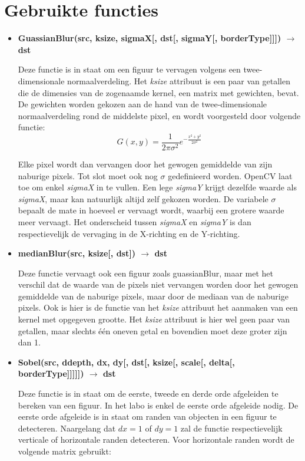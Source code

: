 \documentclass{article}
\begin{document}
	\section{Gebruikte functies}
	\begin{itemize}
		 \item \textbf{GuassianBlur(src, ksize, sigmaX[, dst[, sigmaY[, borderType]]]) $\rightarrow$ dst}
		 
		 Deze functie is in staat om een figuur te vervagen volgens een twee-dimensionale normaalverdeling. Het \textit{ksize} attribuut is een paar van getallen die de dimensies van de zogenaamde kernel, een matrix met gewichten, bevat. De gewichten worden gekozen aan de hand van de twee-dimensionale normaalverdeling rond de middelste pixel, en wordt voorgesteld door volgende functie:
		 $$G(x, y) = \frac{1}{2\pi\sigma^2}e^{-\frac{x^2 + y^2}{2\sigma^2}}$$
		 
		 Elke pixel wordt dan vervangen door het gewogen gemiddelde van zijn naburige pixels. Tot slot moet ook nog $\sigma$ gedefinieerd worden. OpenCV laat toe om enkel \textit{sigmaX} in te vullen. Een lege \textit{sigmaY} krijgt dezelfde waarde als \textit{sigmaX}, maar kan natuurlijk altijd zelf gekozen worden. De variabele $\sigma$ bepaalt de mate in hoeveel er vervaagt wordt, waarbij een grotere waarde meer vervaagt. Het onderscheid tussen \textit{sigmaX} en \textit{sigmaY} is dan respectievelijk de vervaging in de X-richting en de Y-richting.
		
		 \item \textbf{medianBlur(src, ksize[, dst]) $\rightarrow$ dst}
		 
		 Deze functie vervaagt ook een figuur zoals guassianBlur, maar met het verschil dat de waarde van de pixels niet vervangen worden door het gewogen gemiddelde van de naburige pixels, maar door de mediaan van de naburige pixels. Ook is hier is de functie van het \textit{ksize} attribuut het aanmaken van een kernel met opgegeven grootte. Het \textit{ksize} attribuut is hier wel geen paar van getallen, maar slechts één oneven getal en bovendien moet deze groter zijn dan 1.
		 
		 \item \textbf{Sobel(src, ddepth, dx, dy[, dst[, ksize[, scale[, delta[, borderType]]]]]) $\rightarrow$ dst}
		 
		 Deze functie is in staat om de eerste, tweede en derde orde afgeleiden te bereken van een figuur. In het labo is enkel de eerste orde afgeleide nodig. De eerste orde afgeleide is in staat om randen van objecten in een figuur te detecteren. Naargelang dat $dx = 1$ of $dy = 1$ zal de functie respectievelijk verticale of horizontale randen detecteren. Voor horizontale randen wordt de volgende matrix gebruikt:
		 

\end{itemize}
\end{document}
